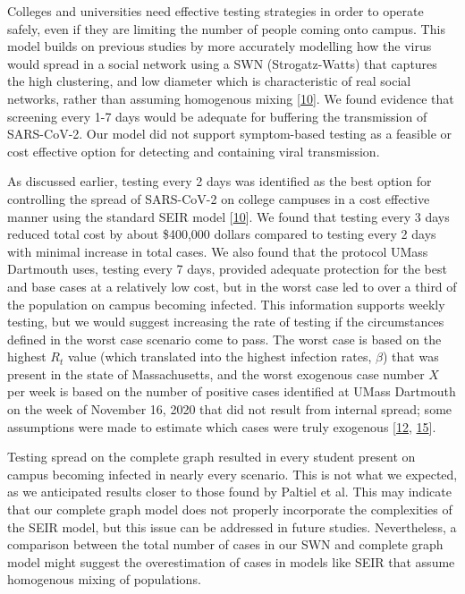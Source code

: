 \documentclass[fullpage]{extarticle}
\begin{document}
\begin{large}
\begin{flushleft}
Colleges and universities need effective testing strategies in order to operate safely, even if they are limiting the number of people coming onto campus. This model builds on previous studies by more accurately modelling how the virus would spread in a social network using a SWN (Strogatz-Watts) that captures the high clustering, and low diameter which is characteristic of real social networks, rather than assuming homogenous mixing [\hyperref[ref:10]{10}]. We found evidence that screening every 1-7 days would be adequate for buffering the transmission of SARS-CoV-2. Our model did not support symptom-based testing as a feasible or cost effective option for detecting and containing viral transmission. \bigbreak

As discussed earlier, testing every 2 days was identified as the best option for controlling the spread of SARS-CoV-2 on college campuses in a cost effective manner using the standard SEIR model [\hyperref[ref:10]{10}]. We found that testing every 3 days reduced total cost by about \$400,000 dollars compared to testing every 2 days with minimal increase in total cases. We also found that the protocol UMass Dartmouth uses, testing every 7 days, provided adequate protection for the best and base cases at a relatively low cost, but in the worst case led to over a third of the population on campus becoming infected. This information supports weekly testing, but we would suggest increasing the rate of testing if the circumstances defined in the worst case scenario come to pass. The worst case is based on the highest $R_t$ value (which translated into the highest infection rates, $\beta$) that was present in the state of Massachusetts, and the worst exogenous case number $X$ per week is based on the number of positive cases identified at UMass Dartmouth on the week of November 16, 2020 that did not result from internal spread; some assumptions were made to estimate which cases were truly exogenous [\hyperref[ref:12]{12}, \hyperref[ref:15]{15}].\bigbreak

Testing spread on the complete graph resulted in every student present on campus becoming infected in nearly every scenario. This is not what we expected, as we anticipated results closer to those found by Paltiel et al. This may indicate that our complete graph model does not properly incorporate the complexities of the SEIR model, but this issue can be addressed in future studies. Nevertheless, a comparison between the total number of cases in our SWN and complete graph model might suggest the overestimation of cases in models like SEIR that assume homogenous mixing of populations.\bigbreak


\end{flushleft}
\end{large}
\end{document}
